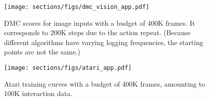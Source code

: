 \begin{figure}[t]
\centering
\texttt{[image: sections/figs/dmc\_vision\_app.pdf]}
\caption{DMC scores for image inputs with a budget of 400K frames. It corresponds to 200K steps due to the action repeat. (Because different algorithms have varying logging frequencies, the starting points are not the same.)}
\label{dmc_vision}
\end{figure}

\begin{figure}[t]
\centering
\texttt{[image: sections/figs/atari\_app.pdf]}
\caption{Atari training curves with a budget of 400K frames, amounting to 100K interaction data.}
\label{atari}
\end{figure}




